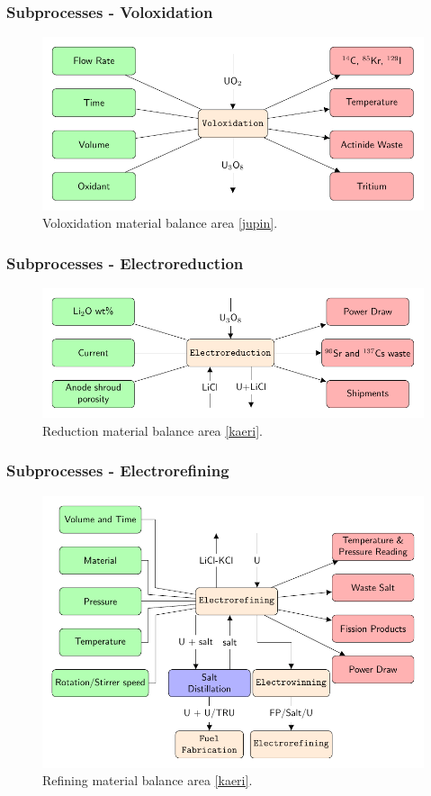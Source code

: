 \begin{frame}
\frametitle{Subprocesses - Voloxidation}
		\begin{figure} 
			\centering
			\includegraphics[width=0.9\linewidth]{volox}
			\caption{Voloxidation material balance area \ref{jupin}.}
			\label{fig:volox}
		\end{figure}
\end{frame}
\begin{frame}
\frametitle{Subprocesses - Electroreduction}
		\begin{figure} 
			\centering
			\includegraphics[width=0.9\linewidth]{reduction}
			\caption{Reduction material balance area \ref{kaeri}.}
			\label{fig:reduction}
		\end{figure}
\end{frame}
\begin{frame}
\frametitle{Subprocesses - Electrorefining}
		\begin{figure}
			\centering
			\includegraphics[width=0.9\linewidth]{refining}
			\caption{Refining material balance area \ref{kaeri}.}
			\label{fig:refining}
		\end{figure}
\end{frame}
